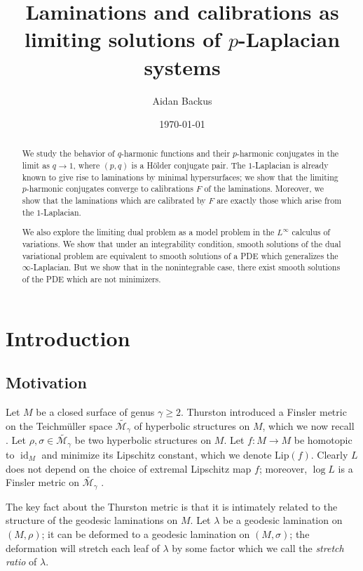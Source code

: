 \documentclass[reqno,11pt]{amsart}
\title{Laminations and calibrations as limiting solutions of $p$-Laplacian systems}
\author{Aidan Backus}
\date{\today}
\DeclareMathOperator{\id}{id}
\newcommand{\Lip}{\mathrm{Lip}}
\newcommand{\dfn}[1]{\emph{#1}\index{#1}}
\theoremstyle{definition}
\numberwithin{equation}{section}
\begin{document}
\begin{abstract}
We study the behavior of $q$-harmonic functions and their $p$-harmonic conjugates in the limit as $q \to 1$, where $(p, q)$ is a H\"older conjugate pair.
The $1$-Laplacian is already known to give rise to laminations by minimal hypersurfaces; we show that the limiting $p$-harmonic conjugates converge to calibrations $F$ of the laminations.
Moreover, we show that the laminations which are calibrated by $F$ are exactly those which arise from the $1$-Laplacian.

We also explore the limiting dual problem as a model problem in the $L^\infty$ calculus of variations.
We show that under an integrability condition, smooth solutions of the dual variational problem are equivalent to smooth solutions of a PDE which generalizes the $\infty$-Laplacian.
But we show that in the nonintegrable case, there exist smooth solutions of the PDE which are not minimizers.
\end{abstract}

\maketitle

\section{Introduction}
\subsection{Motivation}
Let $M$ be a closed surface of genus $\gamma \geq 2$.
Thurston introduced a Finsler metric on the Teichm\"uller space $\widetilde{\mathscr M_\gamma}$ of hyperbolic structures on $M$, which we now recall \cite{Thurston98}.
Let $\rho, \sigma \in \widetilde{\mathscr M_\gamma}$ be two hyperbolic structures on $M$. 
Let $f: M \to M$ be homotopic to $\id_M$ and minimize its Lipschitz constant, which we denote $\Lip(f)$.
Clearly $L$ does not depend on the choice of extremal Lipschitz map $f$; moreover, $\log L$ is a Finsler metric on $\widetilde{\mathscr M_\gamma}$ \cite{Papadopoulos15}.

The key fact about the Thurston metric is that it is intimately related to the structure of the geodesic laminations on $M$.
Let $\lambda$ be a geodesic lamination on $(M, \rho)$; it can be deformed to a geodesic lamination on $(M, \sigma)$; the deformation will stretch each leaf of $\lambda$ by some factor which we call the \dfn{stretch ratio} of $\lambda$.
\end{document}
